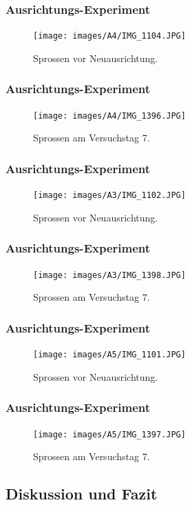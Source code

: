 \documentclass[aspectratio=169]{beamer}
\begin{document}
\begin{frame}
\frametitle{Ausrichtungs-Experiment}
\begin{figure}[H]
\centering
\texttt{[image: images/A4/IMG\_1104.JPG]}
\caption{Sprossen vor Neuausrichtung.\label{A41}}	
\end{figure}
\end{frame}

\begin{frame}
\frametitle{Ausrichtungs-Experiment}
\begin{figure}[H]
\centering
\texttt{[image: images/A4/IMG\_1396.JPG]}
\caption{Sprossen am Versuchstag 7.\label{A47}}
\end{figure}
\end{frame}	
	
\begin{frame}
\frametitle{Ausrichtungs-Experiment}
\begin{figure}[H]
\centering
\texttt{[image: images/A3/IMG\_1102.JPG]}
\caption{Sprossen vor Neuausrichtung.\label{A31}}	
\end{figure}
\end{frame}

\begin{frame}
\frametitle{Ausrichtungs-Experiment}
\begin{figure}[H]
\texttt{[image: images/A3/IMG\_1398.JPG]}
\caption{Sprossen am Versuchstag 7.\label{A37}}
\end{figure}
\end{frame}

\begin{frame}
\frametitle{Ausrichtungs-Experiment}
\begin{figure}[H]
\centering
\texttt{[image: images/A5/IMG\_1101.JPG]}
\caption{Sprossen vor Neuausrichtung.\label{A51}}		
\end{figure}
\end{frame}

\begin{frame}
\frametitle{Ausrichtungs-Experiment}
\begin{figure}[H]
\centering
\texttt{[image: images/A5/IMG\_1397.JPG]}	\caption{Sprossen am Versuchstag 7.\label{A57}}
\end{figure}
\end{frame}


	
	\subsection{Diskussion und Fazit}
	
\end{document}
